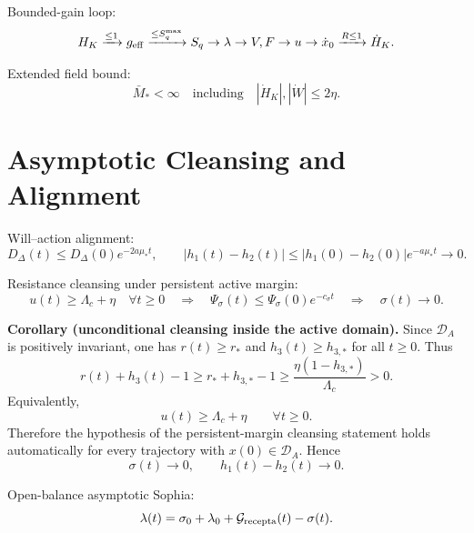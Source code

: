 \documentclass[11pt,a4paper]{article}
\newcommand{\DA}{\mathcal D_A}
\newcommand{\Grec}{\mathcal G_{\rm recepta}}
\theoremstyle{remark}
\begin{document}
Bounded-gain loop:
\begin{equation}
  H_K\xrightarrow{\le1}g_{\rm eff}
  \xrightarrow{\le S_q^{\max}}S_q
  \to\lambda\to V,F\to u\to\dot x_0
  \xrightarrow{R\le1}\dot H_K.
\end{equation}

Extended field bound:
\begin{equation}
  \bar M_*<\infty
  \quad\text{including}\quad
  |\dot H_K|,|\dot W|\le2\eta.
\end{equation}

\section{Asymptotic Cleansing and Alignment}

Will--action alignment:
\begin{equation}
  D_\Delta(t)\le D_\Delta(0)e^{-2a\mu_*t},
  \qquad
  |h_1(t)-h_2(t)|\le |h_1(0)-h_2(0)|e^{-a\mu_*t}\to0.
\end{equation}

Resistance cleansing under persistent active margin:
\begin{equation}
  u(t)\ge\Lambda_c+\eta\quad\forall t\ge0
  \quad\Longrightarrow\quad
  \Psi_\sigma(t)\le\Psi_\sigma(0)e^{-c_\sigma t}
  \quad\Longrightarrow\quad
  \sigma(t)\to0.
\end{equation}

\textbf{Corollary (unconditional cleansing inside the active domain).}
Since \(\DA\) is positively invariant, one has \(r(t)\ge r_*\) and
\(h_3(t)\ge h_{3,*}\) for all \(t\ge0\). Thus
\begin{equation}
  r(t)+h_3(t)-1
  \ge
  r_*+h_{3,*}-1
  \ge
  \frac{\eta(1-h_{3,*})}{\Lambda_c}>0.
\end{equation}
Equivalently,
\begin{equation}
  u(t)\ge\Lambda_c+\eta
  \qquad\forall t\ge0.
\end{equation}
Therefore the hypothesis of the persistent-margin cleansing statement holds automatically for every trajectory with \(x(0)\in\DA\). Hence
\begin{equation}
  \sigma(t)\to0,
  \qquad
  h_1(t)-h_2(t)\to0.
\end{equation}

Open-balance asymptotic Sophia:
\begin{equation}
  \lambda(t)=\sigma_0+\lambda_0+\Grec(t)-\sigma(t).
\end{equation}
\end{document}
